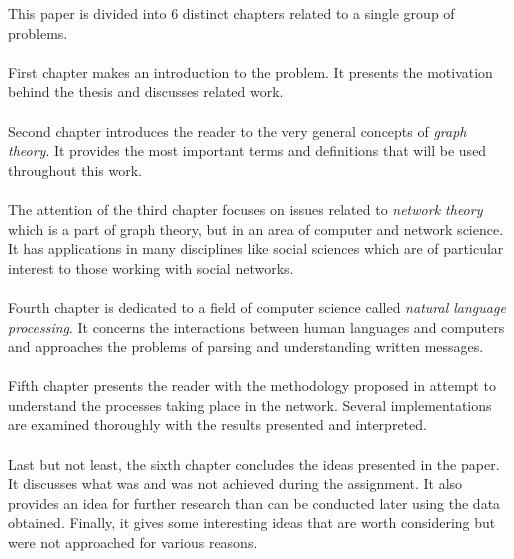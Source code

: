     This paper is divided into 6 distinct chapters related to a single group of problems.
    \\\\
    First chapter makes an introduction to the problem. It presents the motivation behind the thesis and discusses related work.
    \\\\
    Second chapter introduces the reader to the very general concepts of \emph{graph theory}. It provides the most important terms and definitions that will be used throughout this work.
    \\\\
    The attention of the third chapter focuses on issues related to \emph{network theory} which is a part of graph theory, but in an area of computer and network science. It has applications in many disciplines like social sciences which are of particular interest to those working with social networks.
    \\\\
    Fourth chapter is dedicated to a field of computer science called \emph{natural language processing}. It concerns the interactions between human languages and computers and approaches the problems of parsing and understanding written messages.
    \\\\
    Fifth chapter presents the reader with the methodology proposed in attempt to understand the processes taking place in the network. Several implementations are examined thoroughly with the results presented and interpreted.
    \\\\
    Last but not least, the sixth chapter concludes the ideas presented in the paper. It discusses what was and was not achieved during the assignment. It also provides an idea for further research than can be conducted later using the data obtained. Finally, it gives some interesting ideas that are worth considering but were not approached for various reasons.